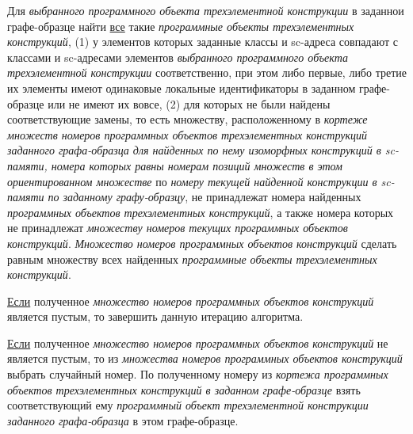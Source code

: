 \begin{SCn}
\begin{scnsubstruct}
\begin{scnsubstruct}
\begin{scnsubstruct}
\begin{scnsubstruct}
\begin{scnsubstruct}
\begin{scnsubstruct}
\begin{scnsubstruct}
\begin{scnsubstruct}
{\begin{scnitemize}
				\item Для \textit{выбранного программного объекта трехэлементной конструкции} в заданнои графе-образце найти \uline{все} такие \textit{программные объекты трехэлементных конструкций}, (1) у элементов которых заданные классы и sc-адреса совпадают с классами и sc-адресами элементов \textit{выбранного программного объекта трехэлементной конструкции} соответственно, при этом либо первые, либо третие их элементы имеют одинаковые локальные идентификаторы в заданном графе-образце или не имеют их вовсе, (2) для которых не были найдены соответствующие замены, то есть множеству, расположенному в \textit{кортеже множеств номеров программных объектов трехэлементных конструкций заданного графа-образца для найденных по нему изоморфных конструкций в sc-памяти, номера которых равны номерам позиций множеств в этом ориентированном множестве} по \textit{номеру текущей найденной конструкции в sc-памяти по заданному графу-образцу}, не принадлежат номера найденных \textit{программных объектов трехэлементных конструкций}, а также номера которых не принадлежат \textit{множеству номеров текущих программных объектов конструкций}. \textit{Множество номеров  программных объектов конструкций} сделать равным множеству всех найденных \textit{программные объекты трехэлементных конструкций}.
				\item \uline{Если} полученное \textit{множество номеров  программных объектов конструкций} является пустым, то завершить данную итерацию алгоритма.
				\item \uline{Если} полученное \textit{множество номеров  программных объектов конструкций} не является пустым, то из \textit{множества номеров  программных объектов конструкций} выбрать случайный номер. По полученному номеру из \textit{кортежа программных объектов трехэлементных конструкций в заданном графе-образце} взять соответствующий ему \textit{программный объект трехэлементной конструкции заданного графа-образца} в этом графе-образце.

\end{scnitemize}}
\end{scnsubstruct}
\end{scnsubstruct}
\end{scnsubstruct}
\end{scnsubstruct}
\end{scnsubstruct}
\end{scnsubstruct}
\end{scnsubstruct}
\end{scnsubstruct}
\end{SCn}
